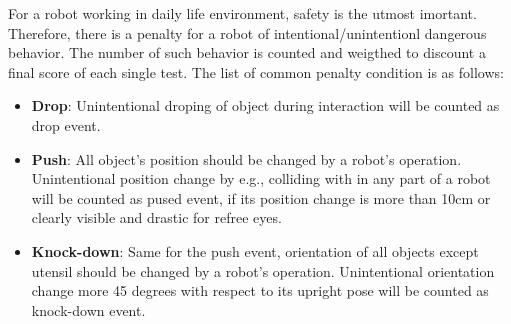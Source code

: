 For a robot working in daily life environment, safety is the utmost imortant.
Therefore, there is a penalty for a robot of intentional/unintentionl dangerous behavior. 
The number of such behavior is counted and weigthed to discount a final score of each single test.
The list of common penalty condition is as follows:
\begin{itemize}
\item
\textbf{Drop}:
Unintentional droping of object during interaction will be counted as drop event.
\item
\textbf{Push}:
All object's position should be changed by a robot's operation.
Unintentional position change by e.g., colliding with in any part of a robot will be counted as pused event, 
if its position change is more than 10cm or clearly visible and drastic for refree eyes.
\item
\textbf{Knock-down}:
Same for the push event, orientation of all objects except utensil should be changed by a robot's operation.
Unintentional orientation change more 45 degrees with respect to its upright pose will be counted as knock-down event. 
\end{itemize}





